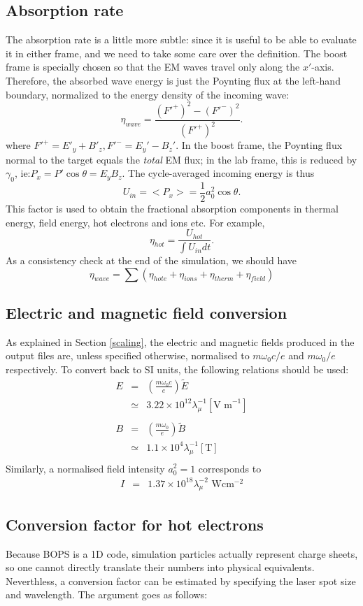 \documentclass[11pt]{article}
\def\be{\begin{equation}}
\def\ee{\end{equation}}
\def\bea{\begin{eqnarray}}
\def\eea{\end{eqnarray}}
\newcommand{\Wcm}{~Wcm$^{-2}$}
\begin{document}
\subsection{Absorption rate}
The absorption rate is a little more subtle: since it is useful to be able
to evaluate it in either frame, and we need to take some care over the 
definition.  The boost frame is specially chosen so that the EM waves travel
only along the $x'$-axis.  Therefore, the absorbed wave energy is just the 
 Poynting flux at the left-hand boundary, normalized to the energy
density of the incoming wave:
%
\be
\eta_{wave} = \frac{({F'^+})^2 - ({F'^-})^2}{({F'^+})^2}.
\ee
%
where $F'^+=E'_y+B'_z, F'^-=E_y'-B_z'$.  In the boost frame, the Poynting 
flux normal to the target equals the {\em total} EM flux; in the lab frame,
this is reduced by $\gamma_0$, ie:$P_x = P'\cos\theta = E_yB_z$. 
The cycle-averaged incoming energy is thus 
%
\be 
U_{in} = <P_x> = \frac{1}{2}a_0^2\cos\theta.
\ee
%
This factor is used to obtain the fractional absorption components in thermal energy,
field energy, hot electrons and ions etc.  For example,
%
\be
\eta_{hot} = \frac{U_{hot}}{\int U_{in}dt} \nonumber.
\ee
%
As a consistency check at the end of the simulation, we should have
%
\be
\eta_{wave} = \sum\left(\eta_{hot e} + \eta_{ions} + \eta_{therm} + 
\eta_{field} \right) \nonumber
\ee

\subsection{Electric and magnetic field conversion}
As explained in Section \ref{scaling}, the electric and magnetic fields produced in the output files
are, unless specified otherwise, normalised to
$m\omega_0c/e$ and $m\omega_0/e$ respectively.  To convert back to SI units, the following relations
should be used:
\bea
E &=& \left(\frac{m\omega_0c}{e}\right)\tilde{E} \nonumber \\
  &\simeq & 3.22 \times 10^{12}\lambda_\mu^{-1} [\mbox{V m}^{-1}] \\
& &\\
B &=&  \left(\frac{m\omega_0}{e}\right)\tilde{B} \nonumber \\
 &\simeq & 1.1\times 10^4 \lambda_\mu^{-1} [\mbox{T}] \\
\eea
Similarly, a normalised field intensity $a_0^2=1$ corresponds to 
\bea
I &=& 1.37\times 10^{18} \lambda_\mu^{-2} \mbox{\Wcm} 
\eea
 
\subsection{Conversion factor for hot electrons}
Because BOPS is a 1D code, simulation particles actually represent charge sheets, so one cannot directly
translate their numbers into physical equivalents.  Neverthless, a conversion factor can be estimated
by specifying the laser spot size and wavelength.  The argument goes as follows:
\end{document}
